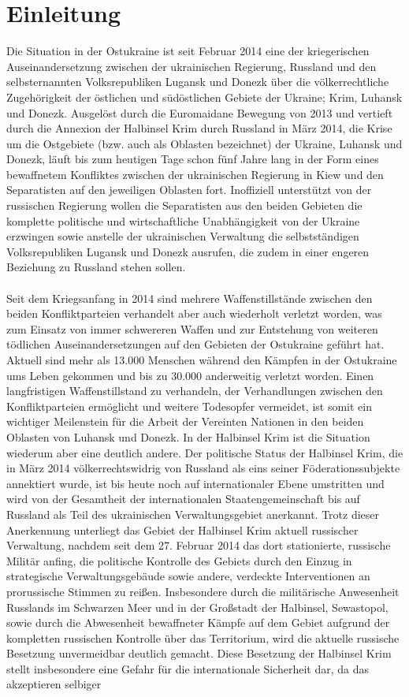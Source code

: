 \documentclass[a4paper,11pt]{article}
\begin{document}
	\section{Einleitung}
Die Situation in der Ostukraine ist seit Februar 2014 eine der kriegerischen Auseinandersetzung zwischen der ukrainischen Regierung, Russland und den selbsternannten Volksrepubliken Lugansk und Donezk über die völkerrechtliche Zugehörigkeit der östlichen und südöstlichen Gebiete der Ukraine; Krim, Luhansk und Donezk. Ausgelöst durch die Euromaidane Bewegung von 2013 und vertieft durch die Annexion der Halbinsel Krim durch Russland in März 2014, die Krise um die Ostgebiete (bzw. auch als Oblasten bezeichnet) der Ukraine, Luhansk und Donezk, läuft bis zum heutigen Tage schon fünf Jahre lang in der Form eines bewaffnetem Konfliktes zwischen der ukrainischen Regierung in Kiew und den Separatisten auf den jeweiligen Oblasten fort. Inoffiziell unterstützt von der russischen Regierung wollen die Separatisten aus den beiden Gebieten die komplette politische und wirtschaftliche Unabhängigkeit von der Ukraine erzwingen sowie anstelle der ukrainischen Verwaltung die selbstständigen Volksrepubliken Lugansk und Donezk ausrufen, die zudem in einer engeren Beziehung zu Russland stehen sollen. \\ \\ Seit dem Kriegsanfang in 2014 sind mehrere Waffenstillstände zwischen den beiden Konfliktparteien verhandelt aber auch wiederholt verletzt worden, was zum Einsatz von immer schwereren Waffen und zur Entstehung von weiteren tödlichen Auseinandersetzungen auf den Gebieten der Ostukraine geführt hat. Aktuell sind mehr als 13.000 Menschen während den Kämpfen in der Ostukraine ums Leben gekommen und bis zu 30.000 anderweitig verletzt worden. Einen langfristigen Waffenstillstand zu verhandeln, der Verhandlungen zwischen den Konfliktparteien ermöglicht und weitere Todesopfer vermeidet, ist somit ein wichtiger Meilenstein für die Arbeit der Vereinten Nationen in den beiden Oblasten von Luhansk und Donezk. In der Halbinsel Krim ist die Situation wiederum aber eine deutlich andere. Der politische Status der Halbinsel Krim, die in März 2014 völkerrechtswidrig von Russland als eins seiner Föderationssubjekte annektiert wurde, ist bis heute noch auf internationaler Ebene umstritten und wird von der Gesamtheit der internationalen Staatengemeinschaft bis auf Russland als Teil des ukrainischen Verwaltungsgebiet anerkannt. Trotz dieser Anerkennung unterliegt das Gebiet der Halbinsel Krim aktuell russischer Verwaltung, nachdem seit dem 27. Februar 2014 das dort stationierte, russische Militär anfing, die politische Kontrolle des Gebiets durch den Einzug in strategische Verwaltungsgebäude sowie andere, verdeckte Interventionen an prorussische Stimmen zu reißen. Insbesondere durch die militärische Anwesenheit Russlands im Schwarzen Meer und in der Großstadt der Halbinsel, Sewastopol, sowie durch die Abwesenheit bewaffneter Kämpfe auf dem Gebiet aufgrund der kompletten russischen Kontrolle über das Territorium, wird die aktuelle russische Besetzung unvermeidbar deutlich gemacht. Diese Besetzung der Halbinsel Krim stellt insbesondere eine Gefahr für die internationale Sicherheit dar, da das akzeptieren selbiger 
\end{document}
